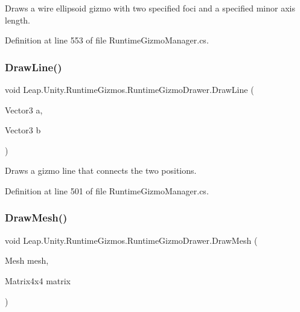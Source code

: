 Draws a wire ellipsoid gizmo with two specified foci and a specified minor axis length. 



Definition at line 553 of file Runtime\+Gizmo\+Manager.\+cs.

\mbox{\label{class_leap_1_1_unity_1_1_runtime_gizmos_1_1_runtime_gizmo_drawer_a7e1e78b8cec3277c218cf05af7b43aae}} 
\subsubsection{\texorpdfstring{DrawLine()}{DrawLine()}}
{\footnotesize\ttfamily void Leap.\+Unity.\+Runtime\+Gizmos.\+Runtime\+Gizmo\+Drawer.\+Draw\+Line (\begin{DoxyParamCaption}\item[{Vector3}]{a,  }\item[{Vector3}]{b }\end{DoxyParamCaption})}



Draws a gizmo line that connects the two positions. 



Definition at line 501 of file Runtime\+Gizmo\+Manager.\+cs.

\mbox{\label{class_leap_1_1_unity_1_1_runtime_gizmos_1_1_runtime_gizmo_drawer_abf1d16a9f0fdf0bc3d28c4d2d0084f81}} 
\subsubsection{\texorpdfstring{DrawMesh()}{DrawMesh()}\hspace{0.1cm}{\footnotesize\ttfamily [1/2]}}
{\footnotesize\ttfamily void Leap.\+Unity.\+Runtime\+Gizmos.\+Runtime\+Gizmo\+Drawer.\+Draw\+Mesh (\begin{DoxyParamCaption}\item[{Mesh}]{mesh,  }\item[{Matrix4x4}]{matrix }\end{DoxyParamCaption})}



